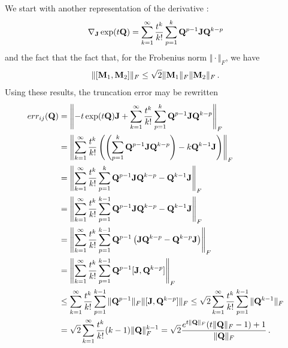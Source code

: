 \documentclass[12pt]{article} %
\begin{document}
We start with another representation of the derivative \citep{al2009computing}:
\begin{align*}
	\nabla_{\mathbf{J}} \exp(t\mathbf{Q}) = \sum_{k=1}^\infty \frac{t^k}{k!} \sum_{p=1}^k \mathbf{Q}^{p-1} \mathbf{J} \mathbf{Q}^{k-p} 
\end{align*}
and the fact that
the fact that, for the Frobenius norm $\Vert \cdot \Vert_F$, we have \citep{wu2010short}
\begin{align*}
	\Vert [\mathbf{M}_1,\mathbf{M}_2] \Vert_F \leq \sqrt{2} \Vert \mathbf{M}_1 \Vert_F \Vert \mathbf{M}_2\Vert_F \, .
\end{align*}
Using these results, the truncation error may be rewritten
\begin{align*}
	err_{ij}(\mathbf{Q})  &=\left\Vert - t\exp(t\mathbf{Q}) \mathbf{J}  +  \sum_{k=1}^\infty \frac{t^k}{k!} \sum_{p=1}^k \mathbf{Q}^{p-1} \mathbf{J} \mathbf{Q}^{k-p}\right\Vert_F \\
	&= \left\Vert \sum_{k=1}^\infty \frac{t^k}{k!} \left( \left( \sum_{p=1}^k \mathbf{Q}^{p-1} \mathbf{J} \mathbf{Q}^{k-p} \right) - k \mathbf{Q}^{k-1} \mathbf{J} \right)  \right\Vert_F\\
	&= \left\Vert \sum_{k=1}^\infty \frac{t^k}{k!} \sum_{p=1}^k \mathbf{Q}^{p-1} \mathbf{J} \mathbf{Q}^{k-p}  -  \mathbf{Q}^{k-1} \mathbf{J} \right\Vert_F \\
	&=\left\Vert  \sum_{k=1}^\infty \frac{t^k}{k!} \sum_{p=1}^{k-1} \mathbf{Q}^{p-1} \mathbf{J} \mathbf{Q}^{k-p}  -  \mathbf{Q}^{k-1} \mathbf{J}\right\Vert_F \\
	&=\left\Vert  \sum_{k=1}^\infty \frac{t^k}{k!} \sum_{p=1}^{k-1} \mathbf{Q}^{p-1}\left( \mathbf{J} \mathbf{Q}^{k-p}  -  \mathbf{Q}^{k-p} \mathbf{J} \right)\right\Vert_F \\
	&= \left\Vert  \sum_{k=1}^\infty \frac{t^k}{k!} \sum_{p=1}^{k-1} \mathbf{Q}^{p-1}[\mathbf{J}, \mathbf{Q}^{k-p}] \right\Vert_F  \\
	&\leq  \sum_{k=1}^\infty \frac{t^k}{k!} \sum_{p=1}^{k-1} \Vert \mathbf{Q}^{p-1} \Vert_F \Vert[\mathbf{J}, \mathbf{Q}^{k-p}]\Vert_F 
	\leq \sqrt{2}  \sum_{k=1}^\infty \frac{t^k}{k!} \sum_{p=1}^{k-1} \Vert \mathbf{Q}^{k-1} \Vert_F  \\
	&= \sqrt{2}  \sum_{k=1}^\infty \frac{t^k}{k!} (k-1) \Vert \mathbf{Q} \Vert_F^{k-1} = \sqrt{2} \frac{e^{t\Vert \mathbf{Q}\Vert_F}(t\Vert\mathbf{Q}\Vert_F - 1) + 1}{\Vert \mathbf{Q} \Vert_F} \, .
\end{align*}
\end{document}
